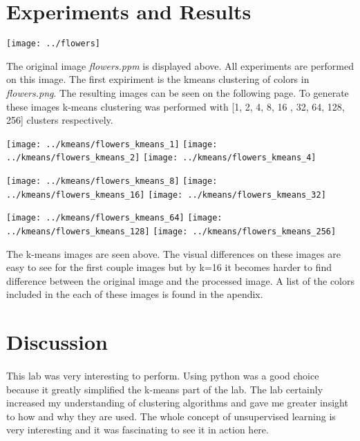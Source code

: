 \documentclass{article}
\begin{document}
\newpage
\section*{Experiments and Results}
\newline
\centerline{\texttt{[image: ../flowers]}}
The original image \textit{flowers.ppm} is displayed above. All experiments
are performed on this image. The first expiriment is the kmeans clustering
of colors in \textit{flowers.png}. The resulting images can be seen on the following page. To generate these images k-means clustering was performed with [1, 2, 4, 8, 16
, 32, 64, 128, 256] clusters respectively.

\newpage
\centerline{
\texttt{[image: ../kmeans/flowers\_kmeans\_1]}
\texttt{[image: ../kmeans/flowers\_kmeans\_2]}
\texttt{[image: ../kmeans/flowers\_kmeans\_4]}}
\centerline{
\texttt{[image: ../kmeans/flowers\_kmeans\_8]}
\texttt{[image: ../kmeans/flowers\_kmeans\_16]}
\texttt{[image: ../kmeans/flowers\_kmeans\_32]}}
\centerline{
\texttt{[image: ../kmeans/flowers\_kmeans\_64]}
\texttt{[image: ../kmeans/flowers\_kmeans\_128]}
\texttt{[image: ../kmeans/flowers\_kmeans\_256]}}
The k-means images are seen above. The visual differences on these images are 
easy to see for the first couple images but by k=16 it becomes harder to find 
difference between the original image and the processed image. A list of the 
colors included in the each of these images is found in the apendix.
\newpage


\section*{Discussion}
\paragraph{}
This lab was very interesting to perform. Using python was a good
choice because it greatly simplified the k-means part of the lab.
The lab certainly increased my understanding of clustering algorithms 
and gave me greater insight to how and why they are used. The whole
concept of unsupervised learning is very interesting and it was fascinating
to see it in action here.
\newpage
\end{document}
